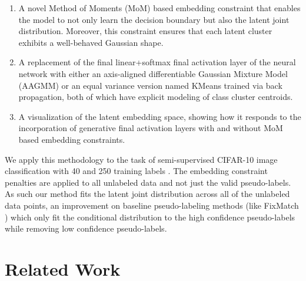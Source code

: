 \documentclass[10pt,twocolumn,letterpaper]{article}
\begin{document}
\begin{enumerate}
	\item A novel Method of Moments (MoM) based embedding constraint that enables the model to not only learn the decision boundary but also the latent joint distribution. 
	Moreover, this constraint ensures that each latent cluster exhibits a well-behaved Gaussian shape.
	\item A replacement of the final linear+softmax final activation layer of the neural network with either an axis-aligned differentiable Gaussian Mixture Model (AAGMM) or an equal variance version named KMeans trained via back propagation, both of which have explicit modeling of class cluster centroids. 
	\item A visualization of the latent embedding space, showing how it responds to the incorporation of generative final activation layers with and without MoM based embedding constraints.
\end{enumerate}

We apply this methodology to the task of semi-supervised CIFAR-10 image classification with 40 and 250 training labels \cite{cifar10}. 
The embedding constraint penalties are applied to all unlabeled data and not just the valid pseudo-labels.  
As such our method fits the latent joint distribution across all of the unlabeled data points, an improvement on baseline pseudo-labeling methods (like FixMatch \cite{sohn2020fixmatch}) which only fit the conditional distribution to the high confidence pseudo-labels while removing low confidence pseudo-labels.


\section{Related Work}
\end{document}
